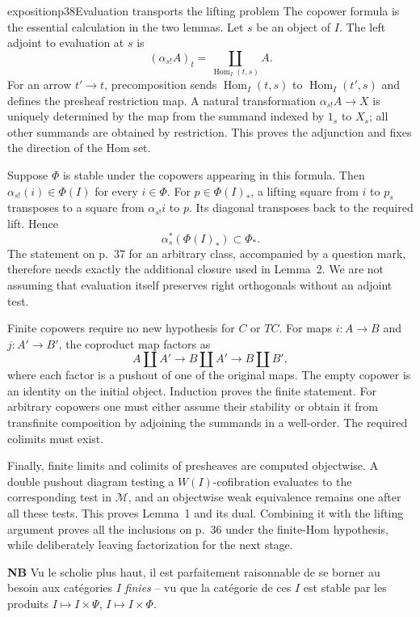 \begin{dcomment}{exposition}{p38}{Evaluation transports the lifting problem}
The copower formula is the essential calculation in the two lemmas. Let $s$ be an object of $I$. The left adjoint to evaluation at $s$ is
\[
 (\alpha_{s!}A)_t=\coprod_{\operatorname{Hom}_I(t,s)}A.
\]
For an arrow $t'\to t$, precomposition sends $\operatorname{Hom}_I(t,s)$ to $\operatorname{Hom}_I(t',s)$ and defines the presheaf restriction map. A natural transformation $\alpha_{s!}A\to X$ is uniquely determined by the map from the summand indexed by $1_s$ to $X_s$; all other summands are obtained by restriction. This proves the adjunction and fixes the direction of the Hom set.

Suppose $\Phi$ is stable under the copowers appearing in this formula. Then $\alpha_{s!}(i)\in\Phi(I)$ for every $i\in\Phi$. For $p\in\Phi(I)_*$, a lifting square from $i$ to $p_s$ transposes to a square from $\alpha_{s!}i$ to $p$. Its diagonal transposes back to the required lift. Hence
\[
 \alpha_s^*(\Phi(I)_*)\subset\Phi_*.
\]
The statement on p.~37 for an arbitrary class, accompanied by a question mark, therefore needs exactly the additional closure used in Lemma~2. We are not assuming that evaluation itself preserves right orthogonals without an adjoint test.

Finite copowers require no new hypothesis for $C$ or $TC$. For maps $i:A\to B$ and $j:A'\to B'$, the coproduct map factors as
\[
 A\amalg A'\longrightarrow B\amalg A'\longrightarrow B\amalg B',
\]
where each factor is a pushout of one of the original maps. The empty copower is an identity on the initial object. Induction proves the finite statement. For arbitrary copowers one must either assume their stability or obtain it from transfinite composition by adjoining the summands in a well-order. The required colimits must exist.

Finally, finite limits and colimits of presheaves are computed objectwise. A double pushout diagram testing a $W(I)$-cofibration evaluates to the corresponding test in $\mathcal M$, and an objectwise weak equivalence remains one after all these tests. This proves Lemma~1 and its dual. Combining it with the lifting argument proves all the inclusions on p.~36 under the finite-Hom hypothesis, while deliberately leaving factorization for the next stage.
\end{dcomment}


\textbf{NB} Vu le scholie plus haut, il est parfaitement raisonnable de se borner au besoin aux catégories $I$ \textit{finies} – vu que la catégorie de ces $I$ est stable par les produits $I\longmapsto I\times\Psi$, $I\longmapsto I\times\Phi$.

